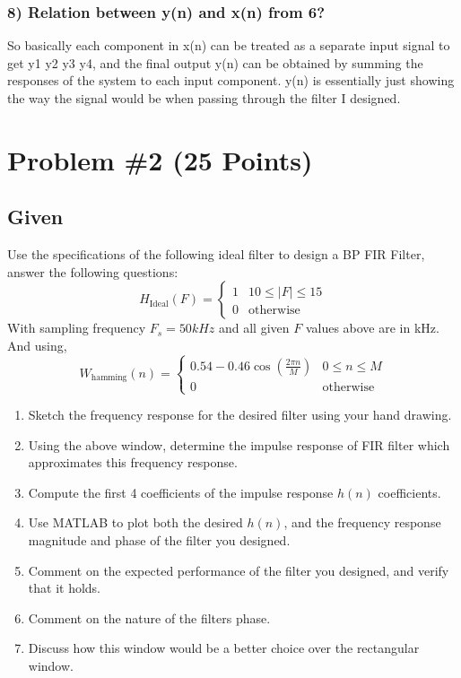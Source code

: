 \documentclass[12pt,letterpaper]{article}
\begin{document}
\subsubsection*{8) Relation between y(n) and x(n) from 6?}
So basically each component in x(n) can be treated as a separate input signal to get y1 y2 y3 y4, and the final output y(n) can be obtained by summing the responses of the system to each input component. y(n) is essentially just showing the way the signal would be when passing through the filter I designed. 








\newpage
\section*{Problem \#2 (25 Points)}
\hrulefill
\subsection*{Given}
Use the specifications of the following ideal filter to design a BP FIR Filter, answer the following questions:
\[
H_{\text{Ideal}}(F) = 
\begin{cases} 
1 & 10 \leq |F| \leq 15 \\
0 & \text{otherwise}
\end{cases}
\]
With sampling frequency \( F_s = 50kHz \) and all given \( F \) values above are in kHz.
And using,
\[
W_{\text{hamming}}(n) = 
\begin{cases} 
0.54 - 0.46 \cos\left(\frac{2\pi n}{M}\right) & 0 \leq n \leq M \\
0 & \text{otherwise}
\end{cases}
\]
\begin{enumerate}
    \item Sketch the frequency response for the desired filter using your hand drawing.
    \item Using the above window, determine the impulse response of FIR filter which approximates this frequency response.
    \item Compute the first 4 coefficients of the impulse response \( h(n) \) coefficients.
    \item Use MATLAB to plot both the desired \( h(n) \), and the frequency response magnitude and phase of the filter you designed.
    \item Comment on the expected performance of the filter you designed, and verify that it holds.
    \item Comment on the nature of the filters phase.
    \item Discuss how this window would be a better choice over the rectangular window.
\end{enumerate}
\newpage
\end{document}
